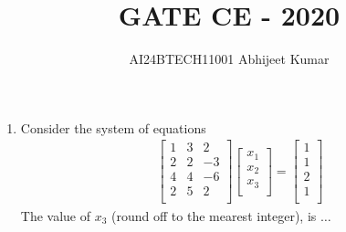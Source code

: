 \documentclass[journal]{IEEEtran}
\begin{document}

\vspace{3cm}


\renewcommand{\thefigure}{\theenumi}
\renewcommand{\thetable}{\theenumi}
\setlength{\intextsep}{10pt} %


\renewcommand{\thetable}{\theenumi}

\title{GATE CE - 2020}
\author{AI24BTECH11001 Abhijeet Kumar}
\maketitle
\renewcommand{\thefigure}{\theenumi}
\renewcommand{\thetable}{\theenumi}
\begin{enumerate}[start=40]
    \item Consider the system of equations
    \begin{align*}
    \begin{bmatrix}
        1 & 3 & 2 \\
        2 & 2 & -3 \\
        4 & 4 & -6 \\
        2 & 5 & 2 \\
    \end{bmatrix}
    \begin{bmatrix}
        x_1 \\
        x_2 \\
        x_3 \\
    \end{bmatrix}
    =
    \begin{bmatrix}
        1 \\
        1 \\
        2 \\
        1 \\
    \end{bmatrix}
    \end{align*}
    The value of $x_3$ (round off to the mearest integer), is $\dots$


\end{enumerate}
\end{document}
